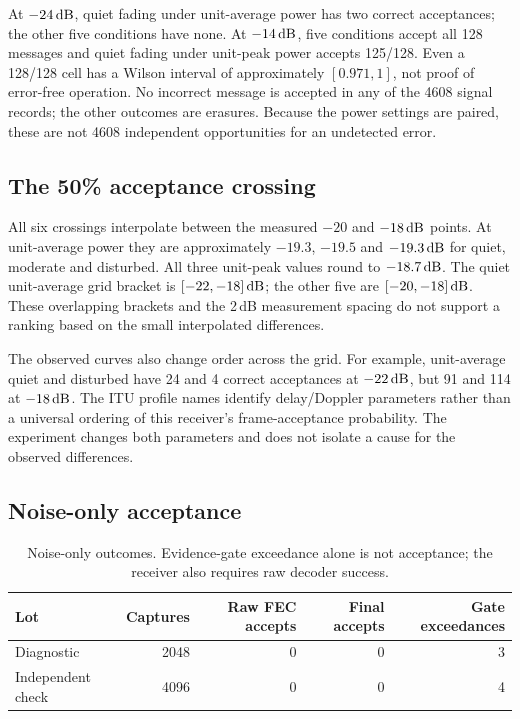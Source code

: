 At $-24\,\mathrm{dB}$, quiet fading under unit-average power has two correct
acceptances; the other five conditions have none. At $-14\,\mathrm{dB}$, five
conditions accept all 128 messages and quiet fading under unit-peak power
accepts 125/128. Even a 128/128 cell has a Wilson interval of approximately
$[0.971,1]$, not proof of error-free operation. No incorrect message is
accepted in any of the 4608 signal records; the other outcomes are erasures.
Because the power settings are paired, these are not 4608 independent
opportunities for an undetected error.

\subsection{The 50\% acceptance crossing}

\begin{table}[htbp]
\centering\small

\caption{Interpolated 50\% crossing in reference-level dB and conservative
95\% grid brackets under a monotone-response assumption. Each bracket
uses six simultaneous exact binomial intervals for its own curve;
coverage is not joint across the six curves.}
\label{tab:thresholds}
\end{table}

All six crossings interpolate between the measured $-20$ and $-18\,\mathrm{dB}$
points. At unit-average power they are approximately $-19.3$, $-19.5$
and $-19.3\,\mathrm{dB}$ for quiet, moderate and disturbed. All three unit-peak
values round to $-18.7\,\mathrm{dB}$. The quiet unit-average grid bracket is
$[-22,-18]\,\mathrm{dB}$; the other five are $[-20,-18]\,\mathrm{dB}$.
These overlapping brackets and the 2\,dB measurement spacing do not
support a ranking based on the small interpolated differences.

The observed curves also change order across the grid. For example,
unit-average quiet and disturbed have 24 and 4 correct acceptances at
$-22\,\mathrm{dB}$, but 91 and 114 at $-18\,\mathrm{dB}$. The ITU profile names identify
delay/Doppler parameters rather than a universal ordering of this receiver's
frame-acceptance probability. The experiment changes both parameters and
does not isolate a cause for the observed differences.

\subsection{Noise-only acceptance}

\begin{table}[htbp]
\centering
\begin{tabular}{@{}lrrrr@{}}
\toprule
Lot & Captures & Raw FEC accepts & Final accepts & Gate exceedances \\
\midrule
Diagnostic & 2048 & 0 & 0 & 3 \\
Independent check & 4096 & 0 & 0 & 4 \\
\bottomrule
\end{tabular}
\caption{Noise-only outcomes. Evidence-gate exceedance alone is not
acceptance; the receiver also requires raw decoder success.}
\label{tab:noise}
\end{table}

